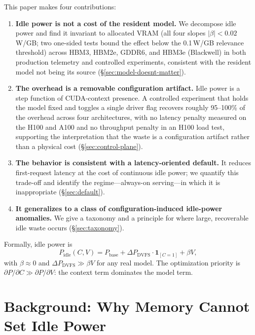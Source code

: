 \documentclass[conference]{IEEEtran}
\begin{document}
This paper makes four contributions:

\begin{enumerate}
\item \textbf{Idle power is not a cost of the resident model.} We decompose idle power and find it invariant to allocated VRAM (all four slopes $|\beta| < 0.02$\,W/GB; two one-sided tests bound the effect below the 0.1\,W/GB relevance threshold) across HBM3, HBM2e, GDDR6, and HBM3e (Blackwell) in both production telemetry and controlled experiments, consistent with the resident model not being its source (\S\ref{sec:model-doesnt-matter}).
\item \textbf{The overhead is a removable configuration artifact.} Idle power is a step function of CUDA-context presence. A controlled experiment that holds the model fixed and toggles a single driver flag recovers roughly 95--100\% of the overhead across four architectures, with no latency penalty measured on the H100 and A100 and no throughput penalty in an H100 load test, supporting the interpretation that the waste is a configuration artifact rather than a physical cost (\S\ref{sec:control-plane}).
\item \textbf{The behavior is consistent with a latency-oriented default.} It reduces first-request latency at the cost of continuous idle power; we quantify this trade-off and identify the regime---always-on serving---in which it is inappropriate (\S\ref{sec:default}).
\item \textbf{It generalizes to a class of configuration-induced idle-power anomalies.} We give a taxonomy and a principle for where large, recoverable idle waste occurs (\S\ref{sec:taxonomy}).
\end{enumerate}

Formally, idle power is
\begin{equation}
P_{\text{idle}}(C, V) = P_{\text{base}} + \Delta P_{\text{DVFS}} \cdot \mathbf{1}_{[C=1]} + \beta V,
\label{eq:model}
\end{equation}
with $\beta \approx 0$ and $\Delta P_{\text{DVFS}} \gg \beta V$ for any real model. The optimization priority is $\partial P/\partial C \gg \partial P/\partial V$: the context term dominates the model term.

\section{Background: Why Memory Cannot Set Idle Power}
\end{document}

